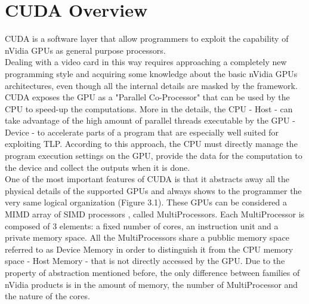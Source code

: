 \chapter{CUDA Overview}\label{sec:i}
CUDA is a software layer that allow programmers to exploit the capability of nVidia GPUs as general purpose processors.\\
Dealing with a video card in this way requires approaching a completely new programming style and acquiring some knowledge about the basic nVidia GPUs architectures, even though all the internal details are masked by the framework.\\
CUDA exposes the GPU as a "Parallel Co-Processor" that can be used by the CPU to speed-up the computations. More in the details, the CPU - Host - can take advantage of the high amount of parallel threads executable by the GPU - Device - to accelerate parts of a program that are especially well suited for exploiting TLP. According to this approach, the CPU must directly manage the program execution settings on the GPU, provide the data for the computation to the device and collect the outputs when it is done.\\
One of the most important features of CUDA is that it abstracts away all the physical details of the supported GPUs and always shows to the programmer  the very same logical organization (Figure 3.1). These GPUs can be considered a MIMD array of SIMD processors %
, called MultiProcessors. Each MultiProcessor is composed of 3 elements: a fixed number of cores, an instruction unit and a private memory space. All the MultiProcessors share a pubblic memory space referred to as Device Memory in order to distinguish it from the CPU memory space - Host Memory - that is not directly accessed by the GPU. Due to the property of abstraction mentioned before, the only difference between families of nVidia products is in the amount of memory, the number of MultiProcessor and the nature of the cores.\\ %


